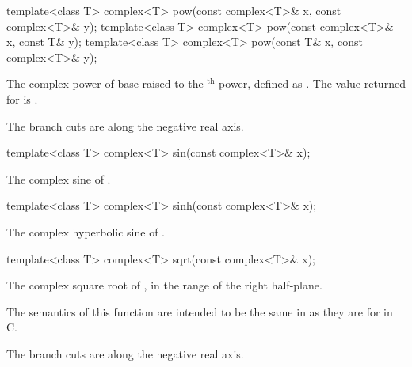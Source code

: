 %
\begin{itemdecl}
template<class T> complex<T> pow(const complex<T>& x, const complex<T>& y);
template<class T> complex<T> pow(const complex<T>& x, const T& y);
template<class T> complex<T> pow(const T& x, const complex<T>& y);
\end{itemdecl}

\begin{itemdescr}
\pnum
\returns
The complex power of base  raised to the $^\text{th}$ power,
defined as
.
The value returned for
is .

\pnum
\remarks
The branch cuts are along the negative real axis.
\end{itemdescr}

%
\begin{itemdecl}
template<class T> complex<T> sin(const complex<T>& x);
\end{itemdecl}

\begin{itemdescr}
\pnum
\returns
The complex sine of .
\end{itemdescr}

%
\begin{itemdecl}
template<class T> complex<T> sinh(const complex<T>& x);
\end{itemdecl}

\begin{itemdescr}
\pnum
\returns
The complex hyperbolic sine of .
\end{itemdescr}

%
\begin{itemdecl}
template<class T> complex<T> sqrt(const complex<T>& x);
\end{itemdecl}

\begin{itemdescr}
\pnum
\returns
The complex square root of , in the range of the right
half-plane.
\begin{note}
The semantics of this function are intended to be the same in \Cpp{}
as they are for  in C.
\end{note}

\pnum
\remarks
The branch cuts are along the negative real axis.
\end{itemdescr}

